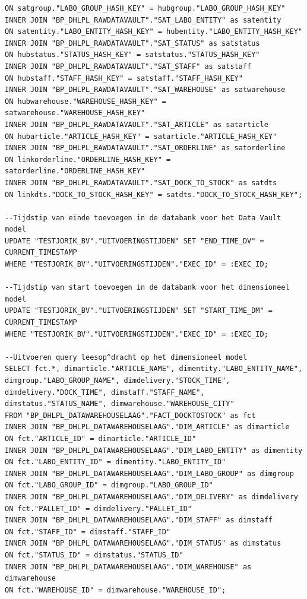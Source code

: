 \begin{lstlisting}[frame=single]
ON satgroup."LABO_GROUP_HASH_KEY" = hubgroup."LABO_GROUP_HASH_KEY"
INNER JOIN "BP_DHLPL_RAWDATAVAULT"."SAT_LABO_ENTITY" as satentity
ON satentity."LABO_ENTITY_HASH_KEY" = hubentity."LABO_ENTITY_HASH_KEY"
INNER JOIN "BP_DHLPL_RAWDATAVAULT"."SAT_STATUS" as satstatus
ON hubstatus."STATUS_HASH_KEY" = satstatus."STATUS_HASH_KEY"
INNER JOIN "BP_DHLPL_RAWDATAVAULT"."SAT_STAFF" as satstaff
ON hubstaff."STAFF_HASH_KEY" = satstaff."STAFF_HASH_KEY"
INNER JOIN "BP_DHLPL_RAWDATAVAULT"."SAT_WAREHOUSE" as satwarehouse
ON hubwarehouse."WAREHOUSE_HASH_KEY" = satwarehouse."WAREHOUSE_HASH_KEY"
INNER JOIN "BP_DHLPL_RAWDATAVAULT"."SAT_ARTICLE" as satarticle
ON hubarticle."ARTICLE_HASH_KEY" = satarticle."ARTICLE_HASH_KEY"
INNER JOIN "BP_DHLPL_RAWDATAVAULT"."SAT_ORDERLINE" as satorderline
ON linkorderline."ORDERLINE_HASH_KEY" = satorderline."ORDERLINE_HASH_KEY"
INNER JOIN "BP_DHLPL_RAWDATAVAULT"."SAT_DOCK_TO_STOCK" as satdts
ON linkdts."DOCK_TO_STOCK_HASH_KEY" = satdts."DOCK_TO_STOCK_HASH_KEY";

--Tijdstip van einde toevoegen in de databank voor het Data Vault model
UPDATE "TESTJORIK_BV"."UITVOERINGSTIJDEN" SET "END_TIME_DV" = CURRENT_TIMESTAMP
WHERE "TESTJORIK_BV"."UITVOERINGSTIJDEN"."EXEC_ID" = :EXEC_ID;

--Tijdstip van start toevoegen in de databank voor het dimensioneel model
UPDATE "TESTJORIK_BV"."UITVOERINGSTIJDEN" SET "START_TIME_DM" = CURRENT_TIMESTAMP
WHERE "TESTJORIK_BV"."UITVOERINGSTIJDEN"."EXEC_ID" = :EXEC_ID;

--Uitvoeren query leesop^dracht op het dimensioneel model 
SELECT fct.*, dimarticle."ARTICLE_NAME", dimentity."LABO_ENTITY_NAME", dimgroup."LABO_GROUP_NAME", dimdelivery."STOCK_TIME", dimdelivery."DOCK_TIME", dimstaff."STAFF_NAME", dimstatus."STATUS_NAME", dimwarehouse."WAREHOUSE_CITY"
FROM "BP_DHLPL_DATAWAREHOUSELAAG"."FACT_DOCKTOSTOCK" as fct
INNER JOIN "BP_DHLPL_DATAWAREHOUSELAAG"."DIM_ARTICLE" as dimarticle
ON fct."ARTICLE_ID" = dimarticle."ARTICLE_ID"
INNER JOIN "BP_DHLPL_DATAWAREHOUSELAAG"."DIM_LABO_ENTITY" as dimentity
ON fct."LABO_ENTITY_ID" = dimentity."LABO_ENTITY_ID"
INNER JOIN "BP_DHLPL_DATAWAREHOUSELAAG"."DIM_LABO_GROUP" as dimgroup
ON fct."LABO_GROUP_ID" = dimgroup."LABO_GROUP_ID"
INNER JOIN "BP_DHLPL_DATAWAREHOUSELAAG"."DIM_DELIVERY" as dimdelivery
ON fct."PALLET_ID" = dimdelivery."PALLET_ID"
INNER JOIN "BP_DHLPL_DATAWAREHOUSELAAG"."DIM_STAFF" as dimstaff
ON fct."STAFF_ID" = dimstaff."STAFF_ID"
INNER JOIN "BP_DHLPL_DATAWAREHOUSELAAG"."DIM_STATUS" as dimstatus
ON fct."STATUS_ID" = dimstatus."STATUS_ID"
INNER JOIN "BP_DHLPL_DATAWAREHOUSELAAG"."DIM_WAREHOUSE" as dimwarehouse
ON fct."WAREHOUSE_ID" = dimwarehouse."WAREHOUSE_ID";


\end{lstlisting}
